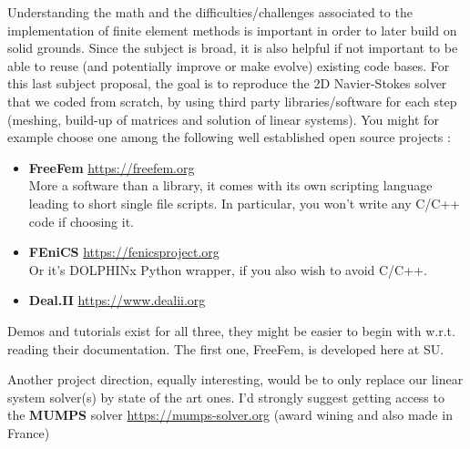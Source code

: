 \documentclass[11pt]{article}
\begin{document}
Understanding the math and the difficulties/challenges associated to the
implementation of finite element methods is important in order to later 
build on solid grounds. Since the subject is broad, it is also helpful if not 
important to be able to reuse (and potentially improve or make evolve) existing
code bases. For this last subject proposal, the goal is to reproduce the   
2D Navier-Stokes solver that we coded from scratch, by  
using third party libraries/software for each step (meshing, build-up of
matrices and solution of linear systems). You might for example choose one 
among the following well established open source projects :
\begin{itemize}
\item {\bf FreeFem} \url{https://freefem.org}\\
More a software than a library, it comes with its own scripting language 
leading to short single file scripts. In particular, you won't write any 
C/C++ code if choosing it.
\item {\bf FEniCS}  \url{https://fenicsproject.org}\\
Or it's DOLPHINx Python wrapper, if you also wish to avoid C/C++.
\item {\bf Deal.II} \url{https://www.dealii.org}\\
\end{itemize}
Demos and tutorials exist for all three, they might be easier to begin with
w.r.t. reading their documentation. The first one, FreeFem, is developed 
here at SU. 

\medskip

\noindent Another project direction, equally interesting, would be to only replace our linear
system solver(s) by state of the art ones. I'd strongly suggest getting access to
the {\bf MUMPS} solver \url{https://mumps-solver.org} (award wining and also
made in France)
\end{document}
